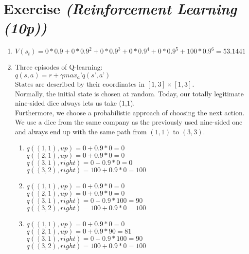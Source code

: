 \documentclass{article}
\begin{document}
\section{Exercise \textit{(Reinforcement Learning (10p))}}
\begin{enumerate}
    \item $V(s_t) = 0*0.9+0*0.9^2+0*0.9^3+0*0.9^4+0*0.9^5+100*0.9^6 = 53.1441 $
    \item Three episodes of Q-learning:\\
        $q(s,a) =  r + \gamma max_a’ q(s’,a’)$\\
        States are described by their coordinates in $[1,3] \times [1,3]$.\\
        Normally, the initial state is chosen at random. Today, our totally
        legitimate nine-sided dice always lets us take (1,1).\\
        Furthermore, we choose a probabilistic approach of choosing the next
        action. We use a dice from the same company as the previously used
        nine-sided one and always end up with the same path from $(1,1)$ to
        $(3,3)$.
        \begin{enumerate}
            \item
             $q((1,1),up) = 0 + 0.9*0 = 0$\\
             $q((2,1),up) = 0 + 0.9*0 = 0$\\
             $q((3,1),right) = 0 + 0.9*0 = 0$\\
             $q((3,2),right) = 100 + 0.9*0 = 100$\\
         \item
             $q((1,1),up) = 0 + 0.9*0 = 0$\\
             $q((2,1),up) = 0 + 0.9*0 = 0$\\
             $q((3,1),right) = 0 + 0.9*100 = 90$\\
             $q((3,2),right) = 100 + 0.9*0 = 100$\\
         \item
             $q((1,1),up) = 0 + 0.9*0 = 0$\\
             $q((2,1),up) = 0 + 0.9*90 = 81$\\
             $q((3,1),right) = 0 + 0.9*100 = 90$\\
             $q((3,2),right) = 100 + 0.9*0 = 100$\\
        \end{enumerate}
\end{enumerate}
\end{document}

